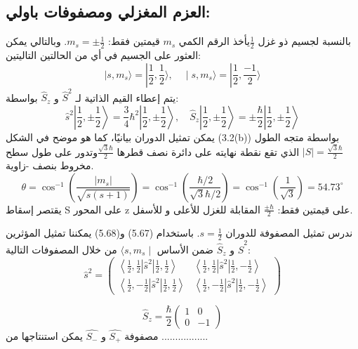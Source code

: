 \subsection{العزم المغزلي ومصفوفات باولي:}
بالنسبة لجسيم ذو غزل $\frac{1}{2}$يأخذ الرقم الكمي ${m}_{s}$  قيمتين فقط:  $ {m}_{s}=\pm{\frac{1}{2}}$. وبالتالي يمكن العثور على الجسيم في أي من الحالتين التاليتين:
\begin{equation}
\mid s, m_s\rangle=|\frac{1}{2}, \frac{1}{2}\rangle,\quad
\mid s, m_s\rangle=|\frac{1}{2}, \frac{-1}{2}\rangle
\end{equation}
يتم إعطاء القيم الذاتية لـ $\hat{S}^2$ و $\hat{S}_z $ بواسطة:
\begin{equation}
	\hat{s}^2\left|\frac{1}{2}, \pm \frac{1}{2}\right\rangle=\frac{3}{4} \hbar^2\left|\frac{1}{2}, \pm \frac{1}{2}\right\rangle, \quad \hat{S}_z\left|\frac{1}{2}, \pm \frac{1}{2}\right\rangle= \pm \frac{\hbar}{2}\left|\frac{1}{2}, \pm \frac{1}{2}\right\rangle
\end{equation}
يمكن تمثيل الدوران بيانيًا، كما هو موضح في الشكل (3.2(b)) بواسطة متجه الطول
 $\mid S\mid=\frac{\sqrt{3} \hbar}{2}$ 
 الذي تقع نقطة نهايته على دائرة نصف قطرها $\frac{\sqrt{3} \hbar}{2}$وتدور على طول سطح مخروط بنصف -زاوية.
\begin{equation}
	\theta=\cos ^{-1}\left(\frac{\left|m_s\right|}{\sqrt{s(s+1)}}\right)=\cos ^{-1}\left(\frac{\hbar / 2}{\sqrt{3} \hbar / 2}\right)=\cos ^{-1}\left(\frac{1}{\sqrt{3}}\right)=54.73^{\circ} 
\end{equation}
يقتصر إسقاط S على المحور z على قيمتين فقط: $\frac{\pm \hbar}{2}$ المقابلة للغزل للأعلى و للأسفل.


ندرس تمثيل المصفوفة للدوران $s=\frac{1}{2}$. باستخدام (5.67) و(5.68) يمكننا تمثيل المؤثرين $\hat{S}^2$ و $\hat{S}_z $ ضمن الأساس  $\langle s, m_s \mid$  من خلال المصفوفات التالية:
\begin{equation}
\hat{s}^2=	\left(\begin{array}{ll}
		\left\langle\frac{1}{2}, \frac{1}{2} \left|\hat{s}^2\right|\frac{1}{2},\frac{1}{2}\right\rangle & \left\langle\frac{1}{2}, \frac{1}{2} \left|\hat{s}^2\right|\frac{1}{2},-\frac{1}{2}\right\rangle \\
		\left\langle\frac{1}{2}, -\frac{1}{2} \left|\hat{s}^2\right|\frac{1}{2},\frac{1}{2}\right\rangle	 & \left\langle\frac{1}{2}, -\frac{1}{2} \left|\hat{s}^2\right|\frac{1}{2},-\frac{1}{2}\right\rangle
	\end{array}\right)	
\end{equation}

\begin{equation}
\hat{S}_z    =  \frac{ \hbar}{2}\left(\begin{array}{ll}
		1 & 0 \\
		0 & -1
	\end{array}\right)
\end{equation}
مصفوفة $\hat{S_{+}}$  و  $\hat{S_{-}}$  يمكن استنتاجها من .................

